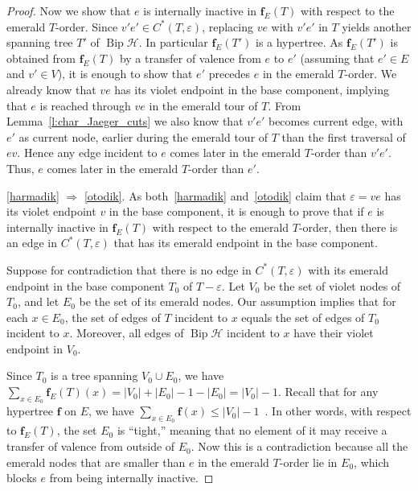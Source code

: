 \documentclass[10pt]{amsart}
\theoremstyle{definition}\newtheorem{defi}[theo]{Definition}
\theoremstyle{remark}\newtheorem{rema}[theo]{Remark}
\newcommand{\HH}{\mathcal H}
\DeclareMathOperator{\bip}{Bip}
\begin{document}
\begin{proof}
Now we show that $e$ is internally inactive in $\mathbf f_E(T)$ with respect to the emerald $T$-order. Since $v'e'\in C^*(T,\varepsilon)$, replacing $ve$ with $v'e'$ in $T$ yields another spanning tree $T'$ of $\bip \HH$. In particular $\mathbf f_E(T')$ is a hypertree. As $\mathbf f_E(T')$ is obtained from $\mathbf f_E(T)$ by a transfer of valence from $e$ to $e'$ (assuming that $e'\in E$ and $v'\in V$), it is enough to show that $e'$ precedes $e$ in the emerald $T$-order. We already know that $ve$ has its violet endpoint in the base component, implying that $e$ is reached through $ve$ in the emerald tour of $T$. From Lemma~\ref{l:char_Jaeger_cuts} we also know that $v'e'$ becomes current edge, with $e'$ as current node, earlier during the emerald tour of $T$ than the first traversal of $ev$. Hence any edge incident to $e$ comes later in the emerald $T$-order than $v'e'$. Thus, $e$ comes later in the emerald $T$-order than $e'$. 


\ref{harmadik} $\Rightarrow$ \ref{otodik}. As both~\ref{harmadik} and~\ref{otodik} claim that $\varepsilon=ve$ has its violet endpoint $v$ in the base component, it is enough to prove that if $e$ is internally inactive in $\mathbf f_E(T)$ with respect to the emerald $T$-order, then there is an edge in $C^*(T,\varepsilon)$ that has its emerald endpoint in the base component.
 
Suppose for contradiction that there is no edge in $C^*(T,\varepsilon)$ with its emerald endpoint in the base component $T_0$ of $T-\varepsilon$. Let $V_0$ be the set of violet nodes of $T_0$, and let $E_0$ be the set of its emerald nodes. Our assumption implies that for each $x\in E_0$, the set of edges of $T$ incident to $x$ equals the set of edges of $T_0$ incident to $x$. Moreover, all edges of $\bip\HH$ incident to $x$ have their violet endpoint in $V_0$.

Since $T_0$ is a tree spanning $V_0\cup E_0$, we have $\sum_{x\in E_0}\mathbf f_E(T)(x)=|V_0|+|E_0|-1-|E_0|=|V_0|-1$. Recall that for any hypertree $\mathbf f$ on $E$, we have $\sum_{x\in E_0}\mathbf f(x)\leq |V_0|-1$~\cite[Theorem~3.4]{hiperTutte}. In other words, with respect to $\mathbf f_E(T)$, the set $E_0$ is ``tight,'' meaning that no element of it may receive a transfer of valence from outside of $E_0$. Now this is a contradiction because all the emerald nodes that are smaller than $e$ in the emerald $T$-order lie in $E_0$, which blocks $e$ from being internally inactive. 


\end{proof}
\end{document}
